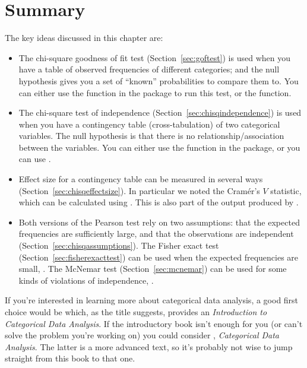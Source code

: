 \section{Summary}

The key ideas discussed in this chapter are:

\begin{itemize}
\item The chi-square goodness of fit test (Section~\ref{sec:goftest}) is used when you have a table of observed frequencies of different categories; and the null hypothesis gives you a set of ``known'' probabilities to compare them to. You can either use the  function in the  package to run this test, or the  function. 
\item The chi-square test of independence (Section~\ref{sec:chisqindependence}) is used when you have a contingency table (cross-tabulation) of two categorical variables. The null hypothesis is that there is no relationship/association between the variables. You can either use the  function in the  package, or you can use   . 
\item Effect size for a contingency table can be measured in several ways (Section~\ref{sec:chisqeffectsize}). In particular we noted the Cram\'er's $V$ statistic, which can be calculated using . This is also part of the output produced by  .
\item Both versions of the Pearson test rely on two assumptions: that the expected frequencies are sufficiently large, and that the observations are independent (Section~\ref{sec:chisqassumptions}). The Fisher exact test (Section~\ref{sec:fisherexacttest}) can be used when the expected frequencies are small, . The McNemar test (Section~\ref{sec:mcnemar}) can be used for some kinds of violations of independence, . 
\end{itemize}

\noindent
If you're interested in learning more about categorical data analysis, a good first choice would be  which, as the title suggests, provides an {\it Introduction to Categorical Data Analysis}. If the introductory book isn't enough for you (or can't solve the problem you're working on) you could consider , {\it Categorical Data Analysis}. The latter is a more advanced text, so it's probably not wise to jump straight from this book to that one. 

